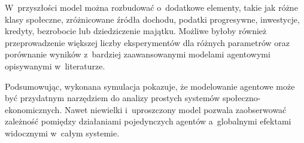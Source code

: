 \documentclass[polish]{projectreport}
\begin{document}
W~przysz\l{}o\'sci model mo\.{z}na rozbudowa\'{c} o~dodatkowe elementy, takie jak r\'o\.{z}ne klasy
spo\l{}eczne, zr\'o\.{z}nicowane \'zr\'od\l{}a dochodu, podatki progresywne, inwestycje, kredyty,
bezrobocie lub dziedziczenie maj\k{a}tku. Mo\.{z}liwe by\l{}oby r\'ownie\.{z} przeprowadzenie
wi\k{e}kszej liczby eksperyment\'ow dla r\'o\.{z}nych parametr\'ow oraz por\'ownanie wynik\'ow
z~bardziej zaawansowanymi modelami agentowymi opisywanymi w~literaturze.
 
Podsumowuj\k{a}c, wykonana symulacja pokazuje, \.{z}e modelowanie agentowe mo\.{z}e by\'{c}
przydatnym narz\k{e}dziem do analizy prostych system\'ow spo\l{}eczno-\allowbreak ekonomicznych.
Nawet niewielki i~uproszczony model pozwala zaobserwowa\'{c} zale\.{z}no\'s\'{c} pomi\k{e}dzy
dzia\l{}aniami pojedynczych agent\'ow a~globalnymi efektami widocznymi w~ca\l{}ym systemie.

\printbibliography
\end{document}
